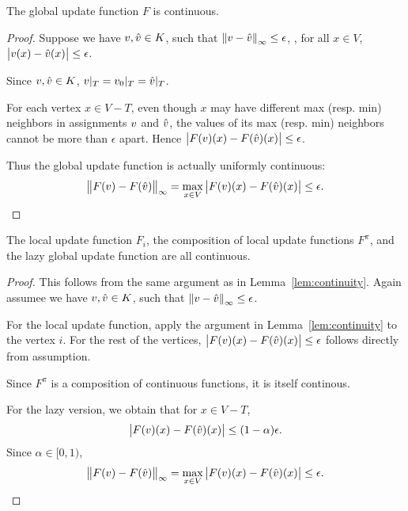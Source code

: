 \documentclass[12pt]{amsart}
\begin{document}
\begin{lemma}\label{lem:continuity}
The global update function $F$ is continuous.
\end{lemma}
\begin{proof}
Suppose we have $v, \hat{v}\in K$, such that $\left\lVert v-\hat{v} \right\rVert_{\infty}\leq \epsilon$, \ie, for all $x\in V$, $\left| v(x)-\hat{v}(x) \right| \leq \epsilon$.

Since $v, \hat{v}\in K$, $v|_T = v_0|_T = \hat{v}|_T$.

For each vertex $x\in V-T$, even though $x$ may have different max (resp. min) neighbors in assignments $v$ and $\hat{v}$, the values of its max (resp. min) neighbors cannot be more than $\epsilon$ apart. Hence $\left| F(v)(x)-F(\hat{v})(x) \right| \leq \epsilon$. %

Thus the global update function is actually uniformly continuous:
\[ \left\lVert F(v)-F(\hat{v}) \right\rVert_{\infty} = \max_{x\in V} \left| F(v)(x)-F(\hat{v})(x) \right| \leq \epsilon. \]
\end{proof}

\begin{corollary}\label{cor:continuity}
The local update function $F_i$, the composition of local update functions $F^\pi$, and the lazy global update function are all continuous.
\end{corollary}

\begin{proof}
This follows from the same argument as in Lemma~\ref{lem:continuity}. Again assumee we have $v, \hat{v}\in K$, such that $\left\lVert v-\hat{v} \right\rVert_{\infty}\leq \epsilon$.

For the local update function, apply the argument in Lemma~\ref{lem:continuity} to the vertex $i$. For the rest of the vertices, $\left| F(v)(x)-F(\hat{v})(x) \right| \leq \epsilon$ follows directly from assumption.

Since $F^\pi$ is a composition of continuous functions, it is itself continous.

For the lazy version, we obtain that for $x\in V-T$, $$\left| F(v)(x)-F(\hat{v})(x) \right| \leq (1-\alpha)\epsilon.$$ Since $\alpha\in [0,1)$, $$ \left\lVert F(v)-F(\hat{v}) \right\rVert_{\infty} = \max_{x\in V} \left| F(v)(x)-F(\hat{v})(x) \right| \leq \epsilon.$$

\end{proof}
\end{document}
